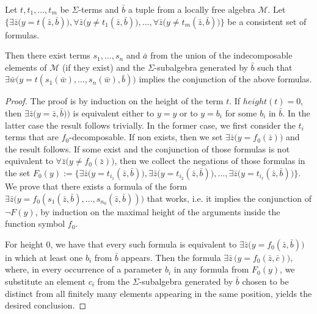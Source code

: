 \documentclass[a4paper,11pt]{article}
\begin{document}
\begin{lemma}\label{Inequalities}
Let  $t, t_1, \ldots, t_m$ be $\Sigma$-terms and $\bar b$ a tuple from a locally free algebra $\mathcal{M}$. Let $\bigl\{ \exists \bar z \big( y=t(\bar z, \bar b)\big), \forall \bar z \big( y\neq t_1(\bar z, \bar b)\big), \ldots, \forall \bar z \big( y\neq t_m(\bar z, \bar b)\big)\bigr\}$ be a consistent set of formulas. 

Then there exist terms $s_1, \ldots, s_n$ and $\bar a$ from the union of the indecomposable elements of $\mathcal{M}$ (if they exist) and the $\Sigma$-subalgebra generated by $\bar b$ such that $\exists \bar w \big( y=t(s_1(\bar w), \ldots, s_n(\bar w), \bar b)\big)$ implies the conjunction of the above formulas.
\end{lemma}
\begin{proof}
The proof is by induction on the height of the term $t$. If $height(t)=0$, then $\exists \bar z \big( y=\bar z, \bar b)\big)$ is equivalent either to $y=y$ or to $y=b_i$ for some $b_i$ in $\bar b$. In the latter case the result follows trivially. In the former case, we first consider the $t_i$ terms that are $f_0$-decomposable. If non exists, then we set $\exists \bar z \big (y=f_0(\bar z)\big)$ and the result follows. If some exist and the conjunction of those formulas is not equivalent to $\forall \bar z\big(y\neq f_0(\bar z)\big)$, then we collect the negations of those formulas in the set $F_0(y):=\big\{\exists \bar z \big(y=t_{i_1}(\bar z, \bar b)\big), \exists \bar z \big(y=t_{i_2}(\bar z, \bar b)\big), \ldots,  \exists \bar z \big(y=t_{i_\ell}(\bar z, \bar b)\big)\big\}$. We prove that there exists a formula of the form $\exists \bar z \big(y=f_0(s_1(\bar z, \bar b), \ldots, s_{n_0}(\bar z, \bar b))\big)$ that works, i.e. it implies the conjunction of $\lnot F(y)$, by induction on the maximal height of the arguments inside the function symbol $f_0$. 


For height $0$, we have that every such formula is equivalent to $\exists \bar z \big(y=f_0(\bar z, \bar b)\big)$ in which at least one $b_i$ from $\bar b$ appears. Then the formula $\exists \bar z \,\bigl(y = f_0(\bar z, \bar c)\bigr)$, where, in every occurrence of a parameter $b_i$ in any formula from $F_0(y)$, we substitute an element $c_i$ from the $\Sigma$-subalgebra generated by $\bar b$ chosen to be distinct from all finitely many elements appearing in the same position, yields the desired conclusion.


\end{proof}
\end{document}
